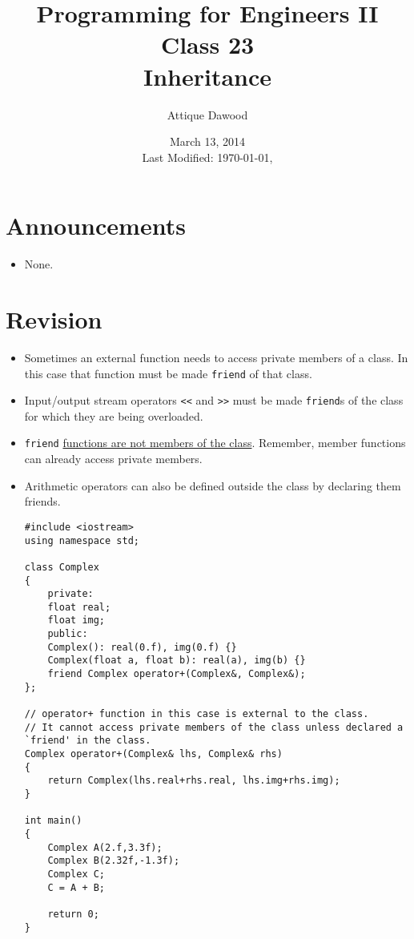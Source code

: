\documentclass[12pt,a4paper]{article}
\title{\vspace{-2cm}Programming for Engineers II\\Class 23\\Inheritance}
\author{Attique Dawood}
\date{March 13, 2014\\[0.2cm] Last Modified: \today, \currenttime}
\begin{document}
\maketitle
\section{Announcements}
\begin{itemize}
\item None.
\end{itemize}
\section{Revision}
\begin{itemize}
\item Sometimes an external function needs to access private members of a class. In this case that function must be made \verb|friend| of that class.
\item Input/output stream operators \verb|<<| and \verb|>>| must be made \verb|friend|s of the class for which they are being overloaded.
\item \verb|friend| \underline{functions are not members of the class}. Remember, member functions can already access private members.
\item Arithmetic operators can also be defined outside the class by declaring them friends.
\begin{lstlisting}[caption={operator+ implemented as \texttt{friend}}]
#include <iostream>
using namespace std;

class Complex
{
	private:
	float real;
	float img;
	public:
	Complex(): real(0.f), img(0.f) {}
	Complex(float a, float b): real(a), img(b) {}
	friend Complex operator+(Complex&, Complex&);
};

// operator+ function in this case is external to the class.
// It cannot access private members of the class unless declared a `friend' in the class.
Complex operator+(Complex& lhs, Complex& rhs)
{
	return Complex(lhs.real+rhs.real, lhs.img+rhs.img);
}

int main()
{
	Complex A(2.f,3.3f);
	Complex B(2.32f,-1.3f);
	Complex C;
	C = A + B;

	return 0;
}
\end{lstlisting}
\end{itemize}
\end{document}
